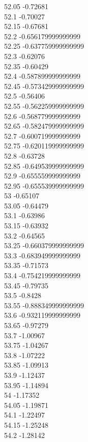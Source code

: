 {52.05	-0.72681\\
52.1	-0.70027\\
52.15	-0.67681\\
52.2	-0.656179999999999\\
52.25	-0.637759999999999\\
52.3	-0.62076\\
52.35	-0.60429\\
52.4	-0.587899999999999\\
52.45	-0.573429999999999\\
52.5	-0.56406\\
52.55	-0.562259999999999\\
52.6	-0.568779999999999\\
52.65	-0.582479999999999\\
52.7	-0.600719999999999\\
52.75	-0.620119999999999\\
52.8	-0.63728\\
52.85	-0.649539999999999\\
52.9	-0.655559999999999\\
52.95	-0.655539999999999\\
53	-0.65107\\
53.05	-0.64479\\
53.1	-0.63986\\
53.15	-0.63932\\
53.2	-0.64565\\
53.25	-0.660379999999999\\
53.3	-0.683949999999999\\
53.35	-0.71573\\
53.4	-0.754219999999999\\
53.45	-0.79735\\
53.5	-0.8428\\
53.55	-0.888349999999999\\
53.6	-0.932119999999999\\
53.65	-0.97279\\
53.7	-1.00967\\
53.75	-1.04267\\
53.8	-1.07222\\
53.85	-1.09913\\
53.9	-1.12437\\
53.95	-1.14894\\
54	-1.17352\\
54.05	-1.19871\\
54.1	-1.22497\\
54.15	-1.25248\\
54.2	-1.28142\\
}
